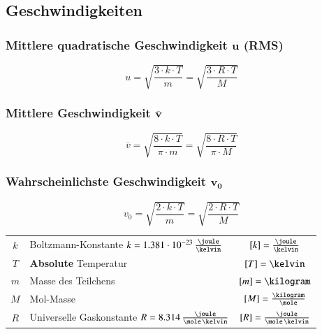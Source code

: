 \subsection{Geschwindigkeiten}

\subsubsection{Mittlere quadratische Geschwindigkeit $\bm{u}$ \normalfont (RMS)}

\vspace{-0.2cm}

$$ \boxed{ u = \sqrt{\frac{3 \cdot k \cdot T}{m}} = \sqrt{ \frac{3 \cdot R \cdot T}{M}} } $$


\subsubsection{Mittlere Geschwindigkeit $\bm{\overline{v}}$}

\vspace{-0.2cm}

$$ \boxed{ \overline{v} = \sqrt{\frac{8 \cdot k \cdot T}{\pi \cdot m}} = \sqrt{ \frac{8 \cdot R \cdot T}{\pi \cdot M}} } $$


\subsubsection{Wahrscheinlichste Geschwindigkeit $\boldsymbol{v_0}$}

\vspace{-0.2cm}

$$ \boxed{ v_0 = \sqrt{\frac{2 \cdot k \cdot T}{m}} = \sqrt{ \frac{2 \cdot R \cdot T}{M}} } $$

\renewcommand{\arraystretch}{1.3}
\begin{tabular}{c l c}
	$k$ & Boltzmann-Konstante $k = 1.381 \cdot 10^{-23} \, \frac{\joule}{\kelvin}$	& $[k] = \frac{\joule}{\kelvin}$			\\
	$T$ & \textbf{Absolute} Temperatur 												& $[T] = \kelvin$ 							\\
	$m$ & Masse des Teilchens 														& $[m] = \kilogram$							\\
	$M$ & Mol-Masse 																& $[M] = \frac{\kilogram}{\mole}$			\\
	$R$	& Universelle Gaskonstante $R = 8.314 \, \frac{\joule}{\mole \, \kelvin}$ 	& $[R] = \frac{\joule}{\mole \, \kelvin}$ 	\\
\end{tabular}
\renewcommand{\arraystretch}{1}

